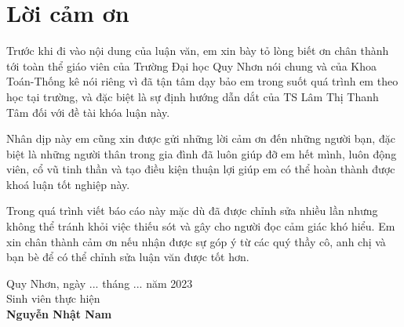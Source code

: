 \documentclass[12pt,a4paper,oneside]{report}
\numberwithin{equation}{section}
\begin{document}
\newpage
\chapter*{Lời cảm ơn}
\begin{justify}
Trước khi đi vào nội dung của luận văn, em xin bày tỏ lòng biết ơn chân thành tới toàn thể giáo viên của Trường Đại học Quy Nhơn nói chung và của Khoa Toán-Thống kê nói riêng vì đã tận tâm dạy bảo em trong suốt quá trình em theo học tại trường, và đặc biệt là sự định hướng dẫn dắt của TS Lâm Thị Thanh Tâm đối với đề tài khóa luận này.

Nhân dịp này em cũng xin được gửi những lời cảm ơn đến những người bạn, đặc biệt là những người thân trong gia đình đã luôn giúp đỡ em hết mình, luôn động viên, cổ vũ tinh thần và tạo điều kiện thuận lợi giúp em có thể hoàn thành được khoá luận tốt nghiệp này.

Trong quá trình viết báo cáo này mặc dù đã được chỉnh sửa nhiều lần nhưng không thể tránh khỏi việc thiếu sót và gây cho người đọc cảm giác khó hiểu. Em xin chân thành cảm ơn nếu nhận được sự góp ý từ các quý thầy cô, anh chị và bạn bè để có thể chỉnh sửa luận văn được tốt hơn.
\end{justify}
\vskip 0.5cm
\begin{flushright}
Quy Nhơn, ngày ... tháng ... năm 2023\qquad\\
Sinh viên thực hiện\qquad\qquad\qquad\qquad\\

\vskip 1.5cm
\textbf{Nguyễn Nhật Nam}\qquad\quad\quad\quad\qquad
\end{flushright}

\tableofcontents

\end{document}
